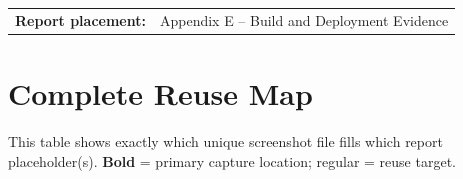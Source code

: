 \documentclass[11pt,a4paper]{article}
\begin{document}
\medskip
\begin{tabular}{@{}ll@{}}
  \textbf{Report placement:} & Appendix E -- Build and Deployment Evidence \\
\end{tabular}

\section{Complete Reuse Map}

This table shows exactly which unique screenshot file fills which report placeholder(s). \textbf{Bold} = primary capture location; regular = reuse target.
\end{document}
